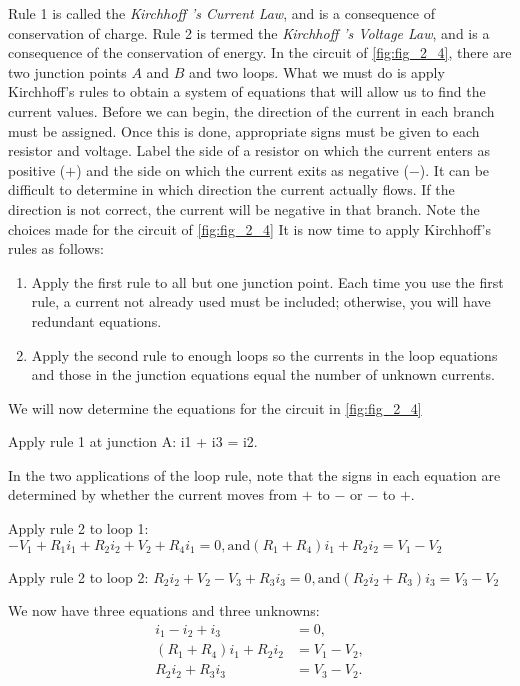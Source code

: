 \documentclass[../main.tex]{subfiles}
\begin{document}
Rule 1 is called the \emph{Kirchhoff ’s Current Law}, and is a consequence of conservation of charge. Rule 2 is termed the \emph{Kirchhoff ’s Voltage Law}, and is a consequence of the conservation of energy. In the circuit of \autoref{fig:fig_2_4}, there are two
junction points $A$ and $B$ and two loops. What we must do is apply Kirchhoff’s rules to obtain a system of equations that will allow us to find the current values. Before we can begin, the direction of the current in each branch must be assigned. Once this is done, appropriate signs must be given to each resistor and voltage. Label the side of a resistor on which the
current enters as positive ($+$) and the side on which the current exits as negative ($-$). It can be difficult to determine in which direction the current actually flows. If the direction is not correct, the current will be negative in that branch. Note the choices made for the circuit of \autoref{fig:fig_2_4} It is now time to apply Kirchhoff’s rules as follows:
\begin{enumerate}[noitemsep, label=\textbf{\arabic*.}]
	\item Apply the first rule to all but one junction point. Each time you use the first rule, a current not already used must be included; otherwise, you will have redundant equations.
	\item Apply the second rule to enough loops so the currents in the loop equations and those in the junction equations equal the number of unknown currents.
\end{enumerate}
We will now determine the equations for the circuit in \autoref{fig:fig_2_4}

Apply rule 1 at junction A: i1 + i3 = i2.

In the two applications of the loop rule, note that the signs in each equation are determined by whether the current moves from $+$ to $-$ or $-$ to $+$.

Apply rule 2 to loop 1: $-V_{1} + R_{1}i_{1} + R_{2}i_{2} + V_{2} + R_{4}i_{1} = 0, \text{and} (R_{1} + R_{4})i_{1} + R_{2}i_{2} = V_{1} - V_{2}$

Apply rule 2 to loop 2:  $R_{2}i_{2} + V_{2} -V_{3} + R_{3}i_{3} = 0, \text{and} (R_{2} i_{2} + R_{3})i_{3}  = V_{3} - V_{2}$

We now have three equations and three unknowns:
\begin{align}
	\label{eq:eq_2_4}
	i_{1} - i_{2} + i_{3} &= 0, \nonumber \\
	(R_{1} + R_{4}) i_{1} + R_{2}i_{2} &= V_{1} - V_{2},\\
	R_{2}i_{2} + R_{3}i_{3} &= V_{3} - V_{2}.\nonumber
\end{align}
\end{document}

